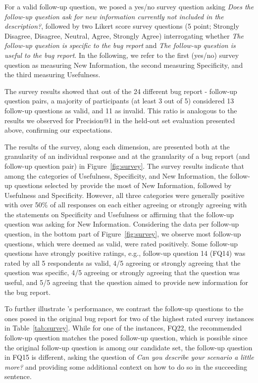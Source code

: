 For a valid follow-up question, we posed a yes/no survey question asking {\em Does the follow-up question ask for new information currently not included in the description?}, followed by two Likert score survey questions (5 point; Strongly Disagree, Disagree, Neutral, Agree, Strongly Agree) interrogating whether {\em The follow-up question is specific to the bug report} and {\em The follow-up question is useful to the bug report}. In the following, we refer to the first (yes/no) survey question as measuring New Information, the second measuring Specificity, and the third measuring Usefulness.

The survey results showed that out of the 24 different bug report - follow-up question pairs, a majority of participants (at least 3 out of 5) considered 13 follow-up questions as valid, and 11 as invalid. This ratio is analogous to the results we observed for Precision@1 in the held-out set evaluation presented above, confirming our expectations.

The results of the survey, along each dimension, are presented both at the granularity of an individual response and at the granularity of a bug report (and follow-up question pair) in Figure~\ref{fig:survey}. The survey results indicate that among the categories of Usefulness, Specificity, and New Information, the follow-up questions selected by \evpi provide the most of New Information, followed by Usefulness and Specificity. However, all three categories were generally positive with over 50\% of all responses on each either agreeing or strongly agreeing with the statements on Specificity and Usefulness or affirming that the follow-up question was asking for New Information. Considering the data per follow-up question, in the bottom part of Figure~\ref{fig:survey}, we observe most follow-up questions, which were deemed as valid, were rated positively.  Some follow-up questions have strongly positive ratings, e.g., follow-up question 14 (FQ14) was rated by all 5 respondents as valid, 4/5 agreeing or strongly agreeing that the question was specific, 4/5 agreeing or strongly agreeing that the question was useful, and 5/5 agreeing that the question aimed to provide new information for the bug report.

To further illustrate \evpi's performance, we contrast the \evpi follow-up questions to the ones posed in the original bug report for two of the highest rated survey instances in Table~\ref{tab:survey}. While for one of the instances, FQ22, the recommended follow-up question matches the posed follow-up question, which is possible since the original follow-up question is among our candidate set, the follow-up question in FQ15 is different, asking the question of {\em Can you describe your scenario a little more?} and providing some additional context on how to do so in the succeeding sentence.


